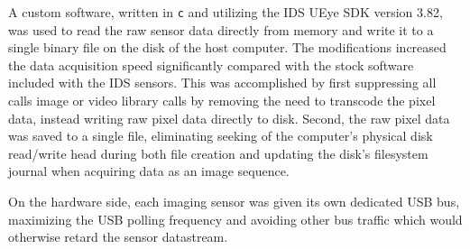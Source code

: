 A custom software, written in \texttt{c} and utilizing the IDS UEye SDK
version 3.82, was used to read the raw sensor data directly from memory and
write it to a single binary file on the disk of the host computer.  The
modifications increased the data acquisition speed significantly compared with
the stock software included with the IDS sensors.  This was accomplished by
first suppressing all calls image or video library calls by removing the need
to transcode the pixel data, instead writing raw pixel data directly to disk.
Second, the raw pixel data was saved to a single file, eliminating seeking of
the computer's physical disk read/write head during both file creation and
updating the disk's filesystem journal when acquiring data as an image
sequence.

On the hardware side, each imaging sensor was given its own dedicated USB
bus, maximizing the USB polling frequency and avoiding other bus traffic
which would otherwise retard the sensor datastream.

